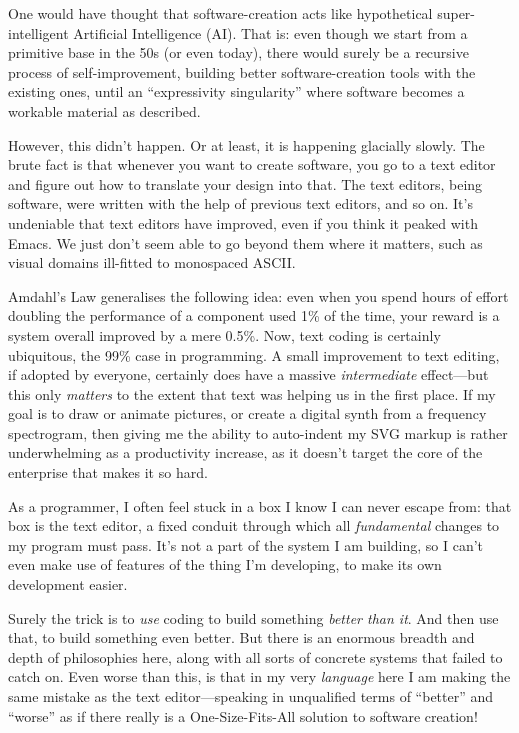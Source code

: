 One would have thought that software-creation acts like hypothetical
super-intelligent Artificial Intelligence (AI). That is: even though we
start from a primitive base in the 50s (or even today), there would
surely be a recursive process of self-improvement, building better
software-creation tools with the existing ones, until an ``expressivity
singularity'' where software becomes a workable material as described.

However, this didn't happen. Or at least, it is happening glacially
slowly. The brute fact is that whenever you want to create software, you
go to a text editor and figure out how to translate your design into
that. The text editors, being software, were written with the help of
previous text editors, and so on. It's undeniable that text editors have
improved, even if you think it peaked with Emacs. We just don't seem
able to go beyond them where it matters, such as visual domains
ill-fitted to monospaced ASCII.

Amdahl's Law generalises the following idea: even when you spend hours
of effort doubling the performance of a component used 1\% of the time,
your reward is a system overall improved by a mere 0.5\%. Now, text
coding is certainly ubiquitous, the 99\% case in programming. A small
improvement to text editing, if adopted by everyone, certainly does have
a massive \emph{intermediate} effect---but this only \emph{matters} to
the extent that text was helping us in the first place. If my goal is to
draw or animate pictures, or create a digital synth from a frequency
spectrogram, then giving me the ability to auto-indent my SVG markup is
rather underwhelming as a productivity increase, as it doesn't target
the core of the enterprise that makes it so hard.

As a programmer, I often feel stuck in a box I know I can never escape
from: that box is the text editor, a fixed conduit through which all
\emph{fundamental} changes to my program must pass. It's not a part of
the system I am building, so I can't even make use of features of the
thing I'm developing, to make its own development easier.

Surely the trick is to \emph{use} coding to build something \emph{better
than it}. And then use that, to build something even better. But there
is an enormous breadth and depth of philosophies here, along with all
sorts of concrete systems that failed to catch on. Even worse than this,
is that in my very \emph{language} here I am making the same mistake as
the text editor---speaking in unqualified terms of ``better'' and
``worse'' as if there really is a One-Size-Fits-All{} solution to
software creation!

